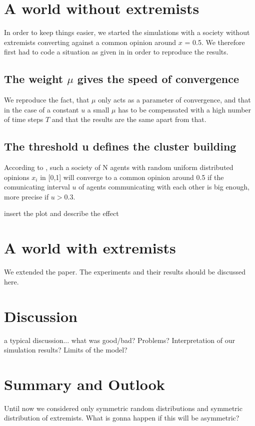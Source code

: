 \documentclass[11pt]{article}
\begin{document}
\section{A world without extremists}
In order to keep things easier, we started the simulations with a society without extremists converting against a common opinion around $x$ = 0.5. We therefore first had to code a situation as given in \cite{Minor} in order to reproduce the results.

\subsection{The weight \texorpdfstring{$\mu$}{TEXT} gives the speed of convergence}
We reproduce the fact, that $\mu$ only acts as a parameter of convergence, and that in the case of a constant $u$ a small $\mu$ has to be compensated with a high number of time steps $T$ and that the results are the same apart from that.


\subsection{The threshold u defines the cluster building}
According to \cite{Minor}, such a society of N agents with random uniform distributed opinions $x_i$ in [0,1] will converge to a common opinion around 0.5 if the comunicating interval $u$ of agents communicating with each other is big enough, more precise if $u>0.3$.

insert the plot and describe the effect

\section{A world with extremists}
We extended the paper. The experiments and their results should be discussed here.


\section{Discussion}
a typical discussion... what was good/bad? Problems? Interpretation of our simulation results? Limits of the model?

\section{Summary and Outlook}
Until now we considered only symmetric random distributions and symmetric distribution of extremists. What is gonna happen if this will be asymmetric?
\end{document}
